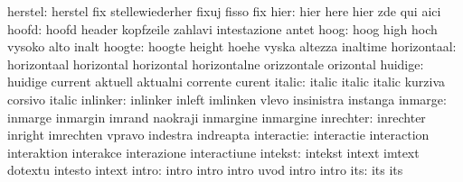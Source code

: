                   herstel: herstel                   fix
                           stellewiederher           fixuj
                           fisso                     fix
                     hier: hier                      here
                           hier                      zde
                           qui                       aici
                    hoofd: hoofd                     header
                           kopfzeile                 zahlavi
                           intestazione              antet
                     hoog: hoog                      high
                           hoch                      vysoko
                           alto                      inalt
                   hoogte: hoogte                    height
                           hoehe                     vyska
                           altezza                   inaltime
              horizontaal: horizontaal               horizontal
                           horizontal                horizontalne
                           orizzontale               orizontal
                  huidige: huidige                   current
                           aktuell                   aktualni
                           corrente                  curent
                   italic: italic                    italic
                           italic                    kurziva
                           corsivo                   italic
                 inlinker: inlinker                  inleft
                           imlinken                  vlevo
                           insinistra                instanga
                  inmarge: inmarge                   inmargin
                           imrand                    naokraji
                           inmargine                 inmargine
                inrechter: inrechter                 inright
                           imrechten                 vpravo
                           indestra                  indreapta
               interactie: interactie                interaction
                           interaktion               interakce
                           interazione               interactiune
                  intekst: intekst                   intext
                           imtext                    dotextu
                           intesto                   intext
                    intro: intro                     intro
                           intro                     uvod
                           intro                     intro
                      its: its                       its
